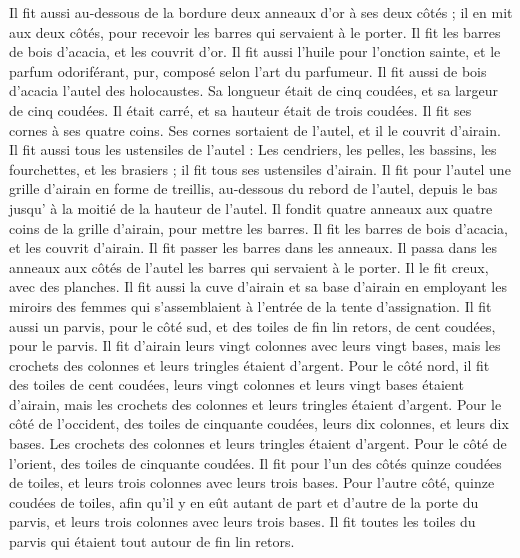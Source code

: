 \begin{multicols}{2}
Il fit aussi au-dessous de la bordure deux anneaux d'or à ses deux côtés ; il en mit aux deux côtés, pour recevoir les barres qui servaient à le porter.
Il fit les barres de bois d’acacia, et les couvrit d'or.
Il fit aussi l'huile pour l'onction sainte, et le parfum odoriférant, pur, composé selon l’art du parfumeur.
\VerseOne{}Il fit aussi de bois d’acacia l'autel des holocaustes. Sa longueur était de cinq coudées, et sa largeur de cinq coudées. Il était carré, et sa hauteur était de trois coudées.
Il fit ses cornes à ses quatre coins. Ses cornes sortaient de l’autel, et il le couvrit d'airain.
Il fit aussi tous les ustensiles de l'autel : Les cendriers, les pelles, les bassins, les fourchettes, et les brasiers ; il fit tous ses ustensiles d'airain.
Il fit pour l'autel une grille d'airain en forme de treillis, au-dessous du rebord de l'autel, depuis le bas jusqu’ à la moitié de la hauteur de l’autel.
Il fondit quatre anneaux aux quatre coins de la grille d'airain, pour mettre les barres.
Il fit les barres de bois d’acacia, et les couvrit d'airain.
Il fit passer les barres dans les anneaux. Il passa dans les anneaux aux côtés de l’autel les barres qui servaient à le porter. Il le fit creux, avec des planches.
Il fit aussi la cuve d'airain et sa base d'airain en employant les miroirs des femmes qui s’assemblaient à l’entrée de la tente d'assignation.
Il fit aussi un parvis, pour le côté sud, et des toiles de fin lin retors, de cent coudées, pour le parvis.
Il fit d'airain leurs vingt colonnes avec leurs vingt bases, mais les crochets des colonnes et leurs tringles étaient d'argent.
Pour le côté nord, il fit des toiles de cent coudées, leurs vingt colonnes et leurs vingt bases étaient d'airain, mais les crochets des colonnes et leurs tringles étaient d'argent.
Pour le côté de l'occident, des toiles de cinquante coudées, leurs dix colonnes, et leurs dix bases. Les crochets des colonnes et leurs tringles étaient d'argent.
Pour le côté de l'orient, des toiles de cinquante coudées.
Il fit pour l'un des côtés quinze coudées de toiles, et leurs trois colonnes avec leurs trois bases.
Pour l'autre côté, quinze coudées de toiles, afin qu'il y en eût autant de part et d’autre de la porte du parvis, et leurs trois colonnes avec leurs trois bases.
Il fit toutes les toiles du parvis qui étaient tout autour de fin lin retors.

\end{multicols}
